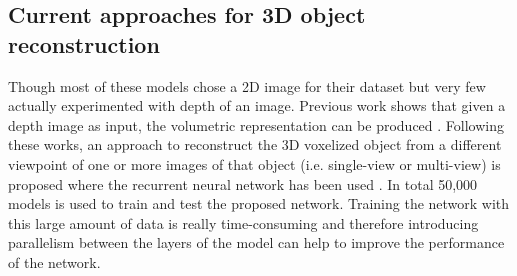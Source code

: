 \documentclass[11pt]{article}       %
\begin{document}
\subsection{Current approaches for 3D object reconstruction } \label{subrev2}
Though most of these models chose a 2D image for their dataset but very few actually experimented with depth of an image. Previous work shows that given a depth image as input, the volumetric representation can be produced \cite{dr2}. Following these works, an approach to reconstruct the 3D voxelized object from a different viewpoint of one or more images of that object (i.e. single-view or multi-view) is proposed where the recurrent neural network has been used \cite{dr7}. In total 50,000 models is used to train and test the proposed network. Training the network with this large amount of data is really time-consuming and therefore introducing parallelism between the layers of the model can help to improve the performance of the network. \newline
\end{document}
